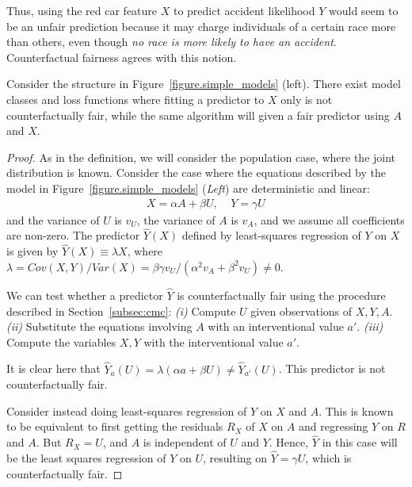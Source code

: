 Thus, using the red car feature $X$ to predict accident likelihood $Y$
would seem to be an unfair prediction because it may charge
individuals of a certain race more than others, even though {\em no
  race is more likely to have an accident}. Counterfactual fairness
agrees with this notion.
%
\begin{lem}
Consider the structure in Figure~\ref{figure.simple_models}
(left). There exist model classes and loss functions where fitting a
predictor to $X$ only is not counterfactually fair, while the same
algorithm will given a fair predictor using $A$ and $X$.
\end{lem}
%
\begin{proof}
As in the definition, we will consider the population case, where the
joint distribution is known. Consider the case where the equations
described by the model in Figure~\ref{figure.simple_models}
(\emph{Left}) are deterministic and linear:
\begin{align}
X = \alpha A + \beta U, \;\;\;\; Y = \gamma U \nonumber
\end{align}
and the variance of $U$ is $v_U$, the variance of $A$ is $v_A$,
and we assume all coefficients are non-zero.
The predictor $\hat Y(X)$ defined by least-squares
regression of $Y$ on $X$ is given by $\hat Y(X) \equiv \lambda X$, where $\lambda =
Cov(X, Y) / Var(X) = \beta\gamma v_U / (\alpha^2 v_A + \beta^2 v_U) \neq 0$.

We can test whether a predictor $\hat{Y}$ is counterfactually fair
using the procedure described in Section~\ref{subsec:cmc}:
{\em (i)} Compute $U$ given observations of $X,Y,A$.%
{\em (ii)} Substitute the equations involving $A$ with an interventional value $a'$.
{\em (iii)} Compute the variables $X,Y$ with the interventional value $a'$.

It is clear here that $\hat Y_a(U) = \lambda(\alpha a + \beta U) \neq
\hat Y_{a'}(U)$. This predictor is not counterfactually fair.

Consider instead doing least-squares regression of $Y$ on $X$ and $A$.
This is known to be equivalent to first getting the residuals $R_X$ of $X$ on $A$
and regressing $Y$ on $R$ and $A$. But $R_X = U$, and $A$ is independent of $U$
and $Y$. Hence, $\hat Y$ in this case will be the least squares regression of
$Y$ on $U$, resulting on $\hat Y = \gamma U$, which is counterfactually fair.
\end{proof}

